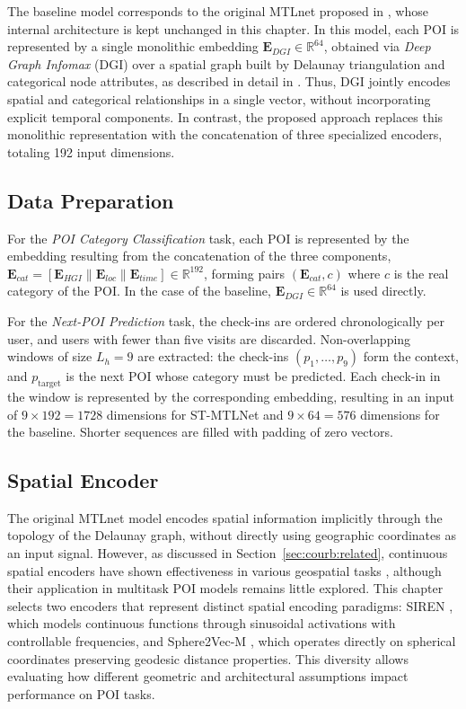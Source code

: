 The baseline model corresponds to the original MTLnet proposed in \cite{silva2025mtlnet}, whose internal architecture is kept unchanged in this chapter. In this model, each POI is represented by a single monolithic embedding $\mathbf{E}_{DGI} \in \mathbb{R}^{64}$, obtained via \textit{Deep Graph Infomax} (DGI) \cite{velickovic2019deep} over a spatial graph built by Delaunay triangulation and categorical node attributes, as described in detail in \cite{silva2025mtlnet}. Thus, DGI jointly encodes spatial and categorical relationships in a single vector, without incorporating explicit temporal components. In contrast, the proposed approach replaces this monolithic representation with the concatenation of three specialized encoders, totaling 192 input dimensions.

\subsection{Data Preparation}

For the \textit{POI Category Classification} task, each POI is represented by the embedding resulting from the concatenation of the three components, $\mathbf{E}_{cat} = [\mathbf{E}_{HGI} \| \mathbf{E}_{loc} \| \mathbf{E}_{time}] \in \mathbb{R}^{192}$, forming pairs $(\mathbf{E}_{cat}, c)$ where $c$ is the real category of the POI. In the case of the baseline, $\mathbf{E}_{DGI} \in \mathbb{R}^{64}$ is used directly.

For the \textit{Next-POI Prediction} task, the check-ins are ordered chronologically per user, and users with fewer than five visits are discarded. Non-overlapping windows of size $L_h = 9$ are extracted: the check-ins $(p_1, \dots, p_9)$ form the context, and $p_{\text{target}}$ is the next POI whose category must be predicted. Each check-in in the window is represented by the corresponding embedding, resulting in an input of $9 \times 192 = 1728$ dimensions for ST-MTLNet and $9 \times 64 = 576$ dimensions for the baseline. Shorter sequences are filled with padding of zero vectors.

\subsection{Spatial Encoder}

The original MTLnet model encodes spatial information implicitly through the topology of the Delaunay graph, without directly using geographic coordinates as an input signal. However, as discussed in Section~\ref{sec:courb:related}, continuous spatial encoders have shown effectiveness in various geospatial tasks \cite{wu2024torchspatial}, although their application in multitask POI models remains little explored. This chapter selects two encoders that represent distinct spatial encoding paradigms: SIREN \cite{russwurm2024geographiclocationencodingspherical}, which models continuous functions through sinusoidal activations with controllable frequencies, and Sphere2Vec-M \cite{mai2023sphere2vecgeneralpurposelocationrepresentation}, which operates directly on spherical coordinates preserving geodesic distance properties. This diversity allows evaluating how different geometric and architectural assumptions impact performance on POI tasks.

